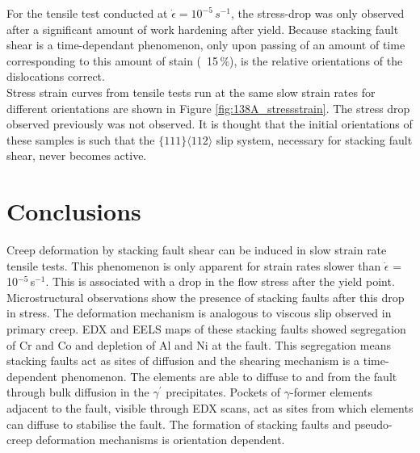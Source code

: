 \documentclass[a4paper,12pt,times,numbered,print,index]{Classes/PhDThesisPSnPDF}
\begin{document}
For the tensile test conducted at $\dot{\epsilon}=10^{-5}\,s^{-1}$, the stress-drop was only observed after a significant amount of work hardening after yield. Because stacking fault shear is a time-dependant phenomenon, only upon passing of an amount of time corresponding to this amount of stain (~15\,\%), is the relative orientations of the dislocations correct.\\
Stress strain curves from tensile tests run at the same slow strain rates for different orientations are shown in Figure \ref{fig:138A_stressstrain}. The stress drop observed previously was not observed. It is thought that the initial orientations of these samples is such that the $\{111\}\langle112\rangle$ slip system, necessary for stacking fault shear, never becomes active.

\section*{Conclusions}
Creep deformation by stacking fault shear can be induced in slow strain rate tensile tests. This phenomenon is only apparent for strain rates slower than $\dot{\epsilon}$ = 10$^{-5}$\,s$^{-1}$. This is associated with a drop in the flow stress after the yield point. Microstructural observations show the presence of stacking faults after this drop in stress. The deformation mechanism is analogous to viscous slip observed in primary creep. EDX and EELS maps of these stacking faults showed segregation of Cr and Co and depletion of Al and Ni at the fault. This segregation means stacking faults act as sites of diffusion and the shearing mechanism is a time-dependent phenomenon. The elements are able to diffuse to and from the fault through bulk diffusion in the $\gamma^{\prime}$ precipitates. Pockets of $\gamma$-former elements adjacent to the fault, visible through EDX scans, act as sites from which elements can diffuse to stabilise the fault. The formation of stacking faults and pseudo-creep deformation mechanisms is orientation dependent.
\end{document}
